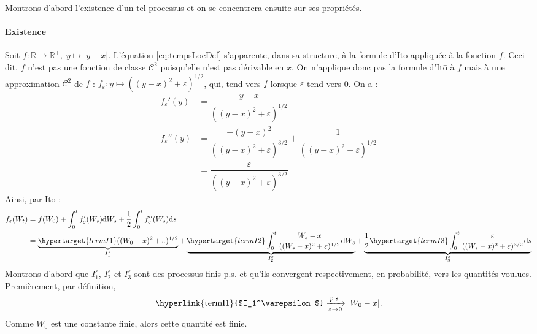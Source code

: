 \documentclass[openany]{book}
\makeatletter
\newcommand{\R}{\mathbb{R}}
\newcommand{\1}{\mathbbm{1}}
\renewcommand{\d}{\mathrm{d}}
\renewenvironment{proof}[1][\textbf{\textit{Démonstration}}]{%
  \par\pushQED{\qed}%
  \normalfont\topsep6\p@\@plus6\p@\relax
  \trivlist\item[\hskip\labelsep
    #1\@addpunct{.}]\ignorespaces
}{%
  \popQED\endtrivlist\@endpefalse
}
\theoremstyle{thmfont}
\theoremstyle{deffont}
\theoremstyle{thmfont}
\theoremstyle{deffont}
\makeatother
\begin{document}
\begin{proof} Montrons d'abord l'existence d'un tel processus et on se concentrera ensuite sur ses propriétés.

  \paragraph{Existence}
  Soit $f : \R \rightarrow \R^+,\; y \mapsto |y-x|$. L'équation \eqref{eq:tempsLocDef} s'apparente, dans sa structure, à la formule d'Itō appliquée à la fonction $f$. Ceci dit, $f$ n'est pas une fonction de classe $\mathcal C^2$ puisqu'elle n'est pas dérivable en $x$. On n'applique donc pas la formule d'Itō à $f$ mais à une approximation $\mathcal C^2$ de $f$ : $f_\varepsilon : y \mapsto ((y-x)^2 +\varepsilon)^{1/2}$, qui, tend vers $f$ lorsque $\varepsilon$ tend vers 0. On a :
  \begin{align*}
    f_\varepsilon'(y) &= \dfrac{y-x}{((y-x)^2 +\varepsilon)^{1/2}}\\
    f_\varepsilon''(y)&= \dfrac{-(y-x)^2}{((y-x)^2 +\varepsilon)^{3/2}} + \dfrac{1}{((y-x)^2 +\varepsilon)^{1/2}}\\
              &= \dfrac{\varepsilon}{((y-x)^2 +\varepsilon)^{3/2}}
  \end{align*}
  Ainsi, par Itō :
  \begin{align}
    f_\varepsilon(W_t) &= f(W_0) + \int_0^t f_\varepsilon'(W_s) \d W_s + \dfrac{1}{2} \int_0^t f_\varepsilon''(W_s) \d s\label{eq:tempsLocApprox}\\
             &= \underbrace{\hypertarget{termI1}((W_0 -x)^2 + \varepsilon)^{1/2}}_{I_1^\varepsilon}
               + \underbrace{\hypertarget{termI2}\int_0^t \dfrac{W_s-x}{((W_s-x)^2 +\varepsilon)^{1/2}}\d W_s}_{I_2^\varepsilon}
               + \underbrace{ \dfrac{1}{2} \hypertarget{termI3} \int_0^t \dfrac{\varepsilon}{((W_s-x)^2 +\varepsilon)^{3/2}} \d s}_{I_3^\varepsilon} \notag
  \end{align}
  Montrons d'abord que \hyperlink{termI1}{$I_1^\varepsilon$}, \hyperlink{termI2}{$I_2^\varepsilon$} et \hyperlink{termI1}{$I_3^\varepsilon$} sont des processus finis p.s. et qu'ils convergent respectivement, en probabilité, vers les quantités voulues. Premièrement, par définition,
  \begin{equation}\text{\hyperlink{termI1}{$I_1^\varepsilon$}} \xrightarrow[\varepsilon \to 0]{p.s.}  |W_0 -x|.\end{equation}
  \noindent Comme $W_0$ est une constante finie, alors cette quantité est finie.\\


\end{proof}
\end{document}
